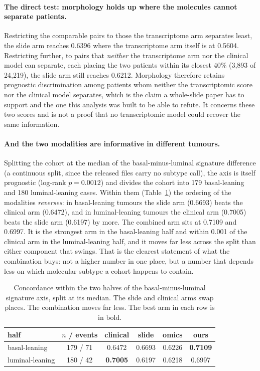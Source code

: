 \documentclass[unnumsec,webpdf,contemporary,large]{oup-authoring-template}
\begin{document}
\paragraph{The direct test: morphology holds up where the molecules cannot separate patients.}
Restricting the comparable pairs to those the transcriptome arm separates least, the slide arm
reaches 0.6396 where the transcriptome arm itself is at 0.5604. Restricting further, to
pairs that \emph{neither} the transcriptome arm nor the clinical model can separate, each placing
the two patients within its closest 40\% (3{,}893 of 24{,}219), the slide arm still reaches 0.6212.
Morphology therefore retains prognostic discrimination among patients whom neither the
transcriptomic score nor the clinical model separates, which is the claim a
whole-slide paper has to support and the one this analysis was built to be able to refute. It
concerns these two scores and is not a proof that no transcriptomic model could recover the same
information.

\paragraph{And the two modalities are informative in different tumours.} Splitting the cohort at
the median of the basal-minus-luminal signature difference (a continuous split, since the released
files carry no subtype call), the axis is itself prognostic (log-rank $p=0.0012$) and divides the
cohort into 179 basal-leaning and 180 luminal-leaning cases. Within them (Table~\ref{tab:subtype})
the ordering of the modalities \emph{reverses}: in basal-leaning tumours the slide arm (0.6693) beats
the clinical arm (0.6472), and in luminal-leaning tumours the clinical arm (0.7005) beats the slide
arm (0.6197) by more. The combined arm sits at 0.7109 and 0.6997. It is the strongest arm in the
basal-leaning half and within 0.001 of the clinical arm in the luminal-leaning half, and it moves
far less across the split than either component that swings. That is the clearest statement of
what the combination buys: not a higher number in one place, but a number that depends less on which
molecular subtype a cohort happens to contain.

\begin{table}[t]
\centering
\caption{Concordance within the two halves of the basal-minus-luminal signature axis, split at its
median. The slide and clinical arms swap places. The combination moves far less. The best arm in
each row is in bold.}
\label{tab:subtype}
\begin{tabular}{lccccc}
\toprule
half & $n$ / events & clinical & slide & omics & ours \\
\midrule
basal-leaning   & 179 / 71 & 0.6472 & 0.6693 & 0.6226 & \textbf{0.7109} \\
luminal-leaning & 180 / 42 & \textbf{0.7005} & 0.6197 & 0.6218 & 0.6997 \\
\bottomrule
\end{tabular}
\end{table}
\end{document}
